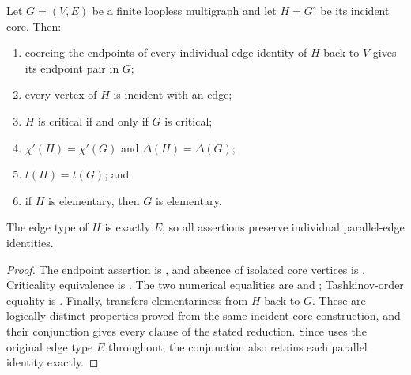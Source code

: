 \begin{theorem}
Let $G=(V,E)$ be a finite loopless multigraph and let $H=G^{\circ}$ be its
incident core.  Then:
\begin{enumerate}
\item coercing the endpoints of every individual edge identity of $H$ back
to $V$ gives its endpoint pair in $G$;
\item every vertex of $H$ is incident with an edge;
\item $H$ is critical if and only if $G$ is critical;
\item $\chi'(H)=\chi'(G)$ and $\Delta(H)=\Delta(G)$;
\item $t(H)=t(G)$; and
\item if $H$ is elementary, then $G$ is elementary.
\end{enumerate}
The edge type of $H$ is exactly $E$, so all assertions preserve individual
parallel-edge identities.
\end{theorem}
\begin{proof}
The endpoint assertion is , and absence of
isolated core vertices is .  Criticality
equivalence is .  The two numerical equalities
are  and
; Tashkinov-order equality is
.  Finally,
 transfers elementariness from $H$
back to $G$.  These are logically distinct properties proved from the same
incident-core construction, and their conjunction gives every clause of the
stated reduction.  Since  uses the original edge type
$E$ throughout, the conjunction also retains each parallel identity exactly.
\end{proof}
